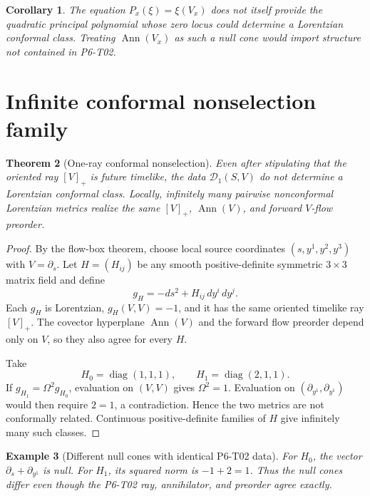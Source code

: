\documentclass[11pt]{article}
\newtheorem{theorem}{Theorem}
\newtheorem{corollary}[theorem]{Corollary}
\newtheorem{example}[theorem]{Example}
\newcommand{\Ann}{\operatorname{Ann}}
\begin{document}
\begin{corollary}
The equation \(P_x(\xi)=\xi(V_x)\) does not itself provide the quadratic
principal polynomial whose zero locus could determine a Lorentzian conformal
class.  Treating \(\Ann(V_x)\) as such a null cone would import structure not
contained in P6-T02.
\end{corollary}

\section{Infinite conformal nonselection family}

\begin{theorem}[One-ray conformal nonselection]
\label{thm:nonselection}
Even after stipulating that the oriented ray \([V]_+\) is future timelike, the
data \(\mathcal D_1(S,V)\) do not determine a Lorentzian conformal class.
Locally, infinitely many pairwise nonconformal Lorentzian metrics realize the
same \([V]_+\), \(\Ann(V)\), and forward \(V\)-flow preorder.
\end{theorem}

\begin{proof}
By the flow-box theorem, choose local source coordinates
\((s,y^1,y^2,y^3)\) with \(V=\partial_s\).  Let \(H=(H_{ij})\) be any smooth
positive-definite symmetric \(3\times3\) matrix field and define
\[
   g_H=-ds^2+H_{ij}\,dy^i\,dy^j.
\]
Each \(g_H\) is Lorentzian, \(g_H(V,V)=-1\), and it has the same oriented
timelike ray \([V]_+\).  The covector hyperplane \(\Ann(V)\) and the forward
flow preorder depend only on \(V\), so they also agree for every \(H\).

Take
\[
   H_0=\operatorname{diag}(1,1,1),\qquad
   H_1=\operatorname{diag}(2,1,1).
\]
If \(g_{H_1}=\Omega^2g_{H_0}\), evaluation on \((V,V)\) gives
\(\Omega^2=1\).  Evaluation on
\((\partial_{y^1},\partial_{y^1})\) would then require \(2=1\), a
contradiction.  Hence the two metrics are not conformally related.
Continuous positive-definite families of \(H\) give infinitely many such
classes.
\end{proof}

\begin{example}[Different null cones with identical P6-T02 data]
For \(H_0\), the vector
\(\partial_s+\partial_{y^1}\) is null.  For \(H_1\), its squared norm is
\(-1+2=1\).  Thus the null cones differ even though the P6-T02 ray,
annihilator, and preorder agree exactly.
\end{example}
\end{document}
